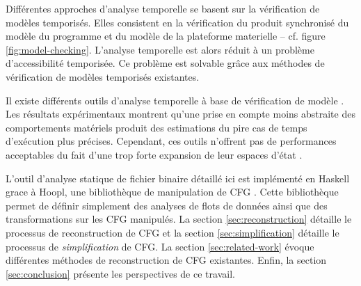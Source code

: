   Différentes approches d'analyse temporelle se basent sur la vérification de
  modèles temporisés. Elles consistent en la vérification du produit synchronisé
  du modèle du programme et du modèle de la plateforme materielle -- cf. figure
  \ref{fig:model-checking}. L'analyse temporelle est alors réduit à un problème
  d'accessibilité temporisée. Ce problème est solvable grâce aux méthodes de
  vérification de modèles temporisés existantes.

  Il existe différents outils d'analyse temporelle à base de vérification de
  modèle \cite{DOT10, CB13}. Les résultats expérimentaux montrent qu'une prise
  en compte moins abstraite des comportements matériels produit des estimations
  du pire cas de temps d'exécution plus précises. Cependant, ces outils
  n'offrent pas de performances acceptables du fait d'une trop forte expansion
  de leur espaces d'état \cite{Wil04}.

  \vspace{1em}


  L'outil d'analyse statique de fichier binaire détaillé ici est implémenté en
  Haskell grace à Hoopl, une bibliothèque de manipulation de CFG
  \cite{RDP10}. Cette bibliothèque permet de définir simplement des analyses de
  flots de données ainsi que des transformations sur les CFG manipulés. La
  section \ref{sec:reconstruction} détaille le processus de reconstruction de
  CFG et la section \ref{sec:simplification} détaille le processus de
  \textit{simplification} de CFG. La section \ref{sec:related-work} évoque
  différentes méthodes de reconstruction de CFG existantes. Enfin, la section
  \ref{sec:conclusion} présente les perspectives de ce travail.
